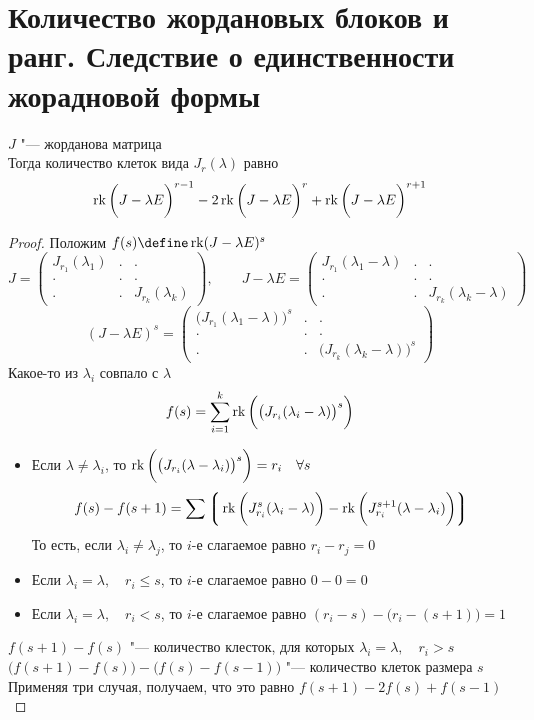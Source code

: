 \section{Количество жордановых блоков и ранг. Следствие о единственности жорадновой формы}

\begin{theorem}
	$ J $ "--- жорданова матрица \\
	Тогда количество клеток вида $ J_r(\lambda) $ равно
	$$ \operatorname{rk} \bigg( J - \lambda E \bigg)^{r - 1} - 2 \operatorname{rk} \bigg( J - \lambda E \bigg)^r + \operatorname{rk} \bigg( J - \lambda E \bigg)^{r + 1} $$
\end{theorem}

\begin{proof}
	Положим $ f(s) \define \rk (J - \lambda E)^s $
	$$ J =
	\begin{pmatrix}
		J_{r_1}(\lambda_1) & . & . \\
		. & . & . \\
		. & . & J_{r_k}(\lambda_k)
	\end{pmatrix}, \qquad J - \lambda E =
	\begin{pmatrix}
		J_{r_1}(\lambda_1 - \lambda) & . & . \\
		. & . & . \\
		. & . & J_{r_k}(\lambda_k - \lambda)
	\end{pmatrix} $$
	$$ (J - \lambda E)^s =
	\begin{pmatrix}
		\bigg( J_{r_1}(\lambda_1 - \lambda) \bigg)^s & . & . \\
		. & . & . \\
		. & . & \bigg( J_{r_k}(\lambda_k - \lambda) \bigg)^s
	\end{pmatrix} $$
	Какое-то из $ \lambda_i $ совпало с $ \lambda $
	$$ f(s) = \sum_{i = 1}^k \operatorname{rk} \bigg( \big( J_{r_i}(\lambda_i - \lambda) \big)^s \bigg) $$
	\begin{itemize}
		\item Если $ \lambda \ne \lambda_i $, то $ \operatorname{rk} \bigg( \big( J_{r_i}(\lambda - \lambda_i) \big)^s \bigg) = r_i \quad \forall s $
		$$ f(s) - f(s + 1) = \sum \bigg\lgroup \operatorname{rk} \bigg( J_{r_i}^s(\lambda_i - \lambda) \bigg) - \operatorname{rk} \bigg( J_{r_i}^{s + 1}(\lambda - \lambda_i) \bigg) \bigg\rgroup $$
		То есть, если $ \lambda_i \ne \lambda_j $, то $ i $-е слагаемое равно $ r_i - r_j = 0 $
		\item Если $ \lambda_i = \lambda, \quad r_i \le s $, то $ i $-е слагаемое равно $ 0 - 0 = 0 $
		\item Если $ \lambda_i = \lambda, \quad r_i < s $, то $ i $-е слагаемое равно $ (r_i - s) - \bigg( r_i - (s + 1) \bigg) = 1 $
	\end{itemize}
	$ f(s + 1) - f(s) $ "--- количество клесток, для которых $ \lambda_i = \lambda, \quad r_i > s $ \\
	$ \bigg( f(s + 1) - f(s) \bigg) - \bigg( f(s) - f(s - 1) \bigg) $ "--- количество клеток размера $ s $ \\
	Применяя три случая, получаем, что это равно $ f(s + 1) - 2f(s) + f(s - 1) $
\end{proof}

